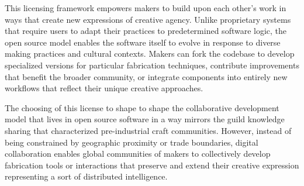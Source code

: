 \vspace{0.5cm}

This licensing framework empowers makers to build upon each other's work in ways that create new expressions of creative agency. Unlike proprietary systems that require users to adapt their practices to predetermined software logic, the open source model enables the software itself to evolve in response to diverse making practices and cultural contexts. Makers can fork the codebase to develop specialized versions for particular fabrication techniques, contribute improvements that benefit the broader community, or integrate components into entirely new workflows that reflect their unique creative approaches.

\vspace{0.5cm}

The choosing of this license to shape to shape the collaborative development model that lives in open source software in a way mirrors the guild knowledge sharing that characterized pre-industrial craft communities. However, instead of being constrained by geographic proximity or trade boundaries, digital collaboration enables global communities of makers to collectively develop fabrication tools or interactions that preserve and extend their creative expression representing a sort of distributed intelligence.